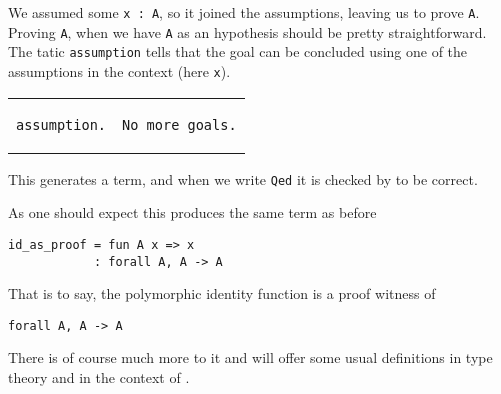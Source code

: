 We assumed some \texttt{x : A}, so it joined the assumptions, leaving
us to prove \texttt{A}.
Proving \texttt{A}, when we have \texttt{A} as an hypothesis
should be pretty straightforward. The tatic \texttt{assumption}
tells \Coq that the goal can be concluded using one of the assumptions in the
context (here \texttt{x}).

\begingroup
\centering
\begin{tabular}{p{}|p{}}
\begin{verbatim}
assumption.
\end{verbatim}
&
\begin{verbatim}
No more goals.
\end{verbatim}
\end{tabular}
\endgroup

This generates a term, and when we write \texttt{Qed} it is checked
by \Coq to be correct.

As one should expect this produces the same term as before
\begin{verbatim}
id_as_proof = fun A x => x
            : forall A, A -> A
\end{verbatim}
That is to say, the polymorphic identity function is a proof witness of
\begin{verbatim}
forall A, A -> A
\end{verbatim}

There is of course much more to it and  will offer some
usual definitions in type theory and in the context of \Coq.